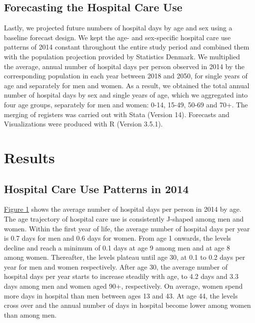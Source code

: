 \subsection{Forecasting the Hospital Care Use}

Lastly, we projected future numbers of hospital days by age and sex using a 
baseline forecast design.\citep{ganguly2016using} We kept the age- and sex-specific 
hospital care use patterns of 2014 constant throughout the entire study period and 
combined them with the population projection provided by Statistics Denmark. We 
multiplied the average, annual number of hospital days per person observed in 2014 
by the corresponding population in each year between 2018 and 2050, for single years 
of age and separately for men and women. As a result, we obtained the total annual 
number of hospital days by sex and single years of age, which we aggregated into four 
age groups, separately for men and women: 0-14, 15-49, 50-69 and 70+. The merging of 
registers was carried out with Stata (Version 14). Forecasts and Visualizations were 
produced with R (Version 3.5.1).\\




\section{Results}

\subsection{Hospital Care Use Patterns in 2014}

\hyperref[ch5:fig1]{Figure 1} shows the average number of hospital days per person in 2014 by age. 
The age trajectory of hospital care use is consistently J-shaped among men and 
women. Within the first year of life, the average number of hospital days per 
year is 0.7 days for men and 0.6 days for women. From age 1 onwards, the levels 
decline and reach a minimum of 0.1 days at age 9 among men and at age 8 among 
women. Thereafter, the levels plateau until age 30, at 0.1 to 0.2 days per year 
for men and women respectively. After age 30, the average number of hospital 
days per year starts to increase steadily with age, to 4.2 days and 3.3 days 
among men and women aged 90+, respectively. On average, women spend more days 
in hospital than men between ages 13 and 43. At age 44, the levels cross over 
and the annual number of days in hospital become lower among women than among 
men.\\

